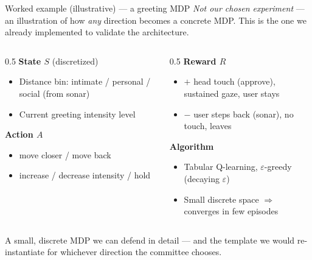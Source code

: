 \documentclass[aspectratio=169,10pt]{beamer}
\begin{document}
\begin{frame}{Worked example (illustrative) --- a greeting MDP}
  {\footnotesize\emph{Not our chosen experiment} --- an illustration of how \emph{any} direction becomes a concrete MDP. This is the one we already implemented to validate the architecture.}
  \vspace{0.3em}
  \begin{columns}[T]
    \begin{column}{0.5\textwidth}
      \textbf{State $S$} (discretized)
      \begin{itemize}\footnotesize
        \item Distance bin: intimate / personal / social (from sonar)
        \item Current greeting intensity level
      \end{itemize}
      \textbf{Action $A$}
      \begin{itemize}\footnotesize
        \item move closer / move back
        \item increase / decrease intensity / hold
      \end{itemize}
    \end{column}
    \begin{column}{0.5\textwidth}
      \textbf{Reward $R$}
      \begin{itemize}\footnotesize
        \item $+$ head touch (approve), sustained gaze, user stays
        \item $-$ user steps back (sonar), no touch, leaves
      \end{itemize}
      \textbf{Algorithm}
      \begin{itemize}\footnotesize
        \item Tabular Q-learning, $\varepsilon$-greedy (decaying $\varepsilon$)
        \item Small discrete space $\Rightarrow$ converges in few episodes
      \end{itemize}
    \end{column}
  \end{columns}
  \vspace{0.4em}
  \begin{block}{}
    \footnotesize A small, discrete MDP we can defend in detail --- and the template we would re-instantiate for whichever direction the committee chooses.
  \end{block}
\end{frame}
\end{document}
